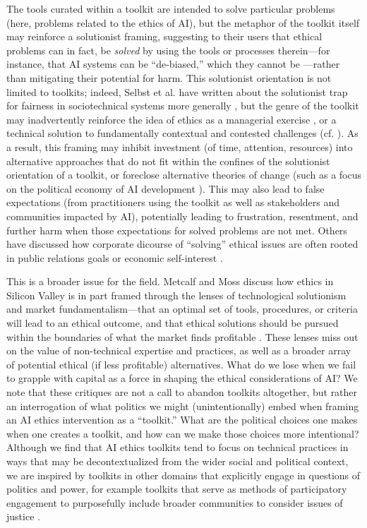 \documentclass[acmsmall]{acmart}
\begin{document}
The tools curated within a toolkit are intended to solve particular problems (here, problems related to the ethics of AI), but the metaphor of the toolkit itself may reinforce a solutionist framing, suggesting to their users that ethical problems can in fact, be \textit{solved} by using the tools or processes therein---for instance, that AI systems can be ``de-biased,'' which they cannot be \cite{blodgett2020language,hoffmann2019wherefairness}---rather than mitigating their potential for harm. This solutionist orientation is not limited to toolkits; indeed, Selbst et al. have written about the solutionist trap for fairness in sociotechnical systems more generally \cite{selbst2019fairness}, but the genre of the toolkit may inadvertently reinforce the idea of ethics as a managerial exercise \cite{kelty_2018}, or a technical solution to fundamentally contextual and contested challenges (cf. \cite{selbst2019fairness, stark2021critical}). As a result, this framing may inhibit investment (of time, attention, resources) into alternative approaches that do not fit within the confines of the solutionist orientation of a toolkit, or foreclose alternative theories of change (such as a focus on the political economy of AI development \cite{stark2021critical}). This may also lead to false expectations (from practitioners using the toolkit as well as stakeholders and communities impacted by AI), potentially leading to frustration, resentment, and further harm when those expectations for solved problems are not met. Others have discussed how corporate dicourse of ``solving'' ethical issues are often rooted in public relations goals or economic self-interest \cite{mcmillan2019againstethical,bietti2020ethicswashing}. 

This is a broader issue for the field. Metcalf and Moss discuss how ethics in Silicon Valley is in part framed through the lenses of technological solutionism and market fundamentalism---that an optimal set of tools, procedures, or criteria will lead to an ethical outcome, and that ethical solutions should be pursued within the boundaries of what the market finds profitable \cite{Metcalf2019OwningEthics}. These lenses miss out on the value of non-technical expertise and practices, as well as a broader array of potential ethical (if less profitable) alternatives. What do we lose when we fail to grapple with capital as a force in shaping the ethical considerations of AI? We note that these critiques are not a call to abandon toolkits altogether, but rather an interrogation of what politics we might (unintentionally) embed when framing an AI ethics intervention as a ``toolkit.'' What are the political choices one makes when one creates a toolkit, and how can we make those choices more intentional? Although we find that AI ethics toolkits tend to focus on technical practices in ways that may be decontextualized from the wider social and political context, we are inspired by toolkits in other domains that explicitly engage in questions of politics and power, for example toolkits that serve as methods of participatory engagement to purposefully include broader communities to consider issues of justice \cite[e.g.,][]{mattern_2021,bray2022radical}.  
\end{document}
